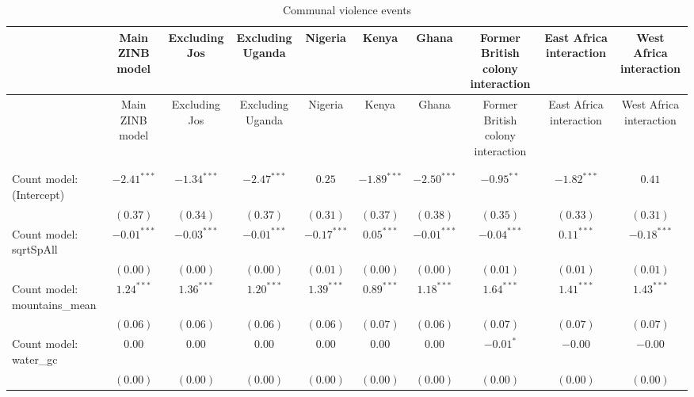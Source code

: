 
\begin{center}
\begin{longtable}{l c c c c c c c c c}
\toprule
 & Main ZINB model & Excluding Jos & Excluding Uganda & Nigeria & Kenya & Ghana & Former British colony interaction & East Africa
	    interaction & West Africa interaction \\
\midrule
\endfirsthead
\toprule
 & Main ZINB model & Excluding Jos & Excluding Uganda & Nigeria & Kenya & Ghana & Former British colony interaction & East Africa
	    interaction & West Africa interaction \\
\midrule
\endhead
\bottomrule
\endfoot
\bottomrule
\multicolumn{10}{l}{\scriptsize{$^{***}p<0.001$; $^{**}p<0.01$; $^{*}p<0.05$; $^{\cdot}p<0.1$}}\\
\caption{Communal violence events}
\label{zorg3}
\endlastfoot \\
Count model: (Intercept)       & $-2.41^{***}$ & $-1.34^{***}$ & $-2.47^{***}$ & $0.25$        & $-1.89^{***}$   & $-2.50^{***}$   & $-0.95^{**}$  & $-1.82^{***}$  & $0.41$        \\
                               & $(0.37)$      & $(0.34)$      & $(0.37)$      & $(0.31)$      & $(0.37)$        & $(0.38)$        & $(0.35)$      & $(0.33)$       & $(0.31)$      \\
Count model: sqrtSpAll         & $-0.01^{***}$ & $-0.03^{***}$ & $-0.01^{***}$ & $-0.17^{***}$ & $0.05^{***}$    & $-0.01^{***}$   & $-0.04^{***}$ & $0.11^{***}$   & $-0.18^{***}$ \\
                               & $(0.00)$      & $(0.00)$      & $(0.00)$      & $(0.01)$      & $(0.00)$        & $(0.00)$        & $(0.01)$      & $(0.01)$       & $(0.01)$      \\
Count model: mountains\_mean   & $1.24^{***}$  & $1.36^{***}$  & $1.20^{***}$  & $1.39^{***}$  & $0.89^{***}$    & $1.18^{***}$    & $1.64^{***}$  & $1.41^{***}$   & $1.43^{***}$  \\
                               & $(0.06)$      & $(0.06)$      & $(0.06)$      & $(0.06)$      & $(0.07)$        & $(0.06)$        & $(0.07)$      & $(0.07)$       & $(0.07)$      \\
Count model: water\_gc         & $0.00$        & $0.00$        & $0.00$        & $0.00$        & $0.00$          & $0.00$          & $-0.01^{*}$   & $-0.00$        & $-0.00$       \\
                               & $(0.00)$      & $(0.00)$      & $(0.00)$      & $(0.00)$      & $(0.00)$        & $(0.00)$        & $(0.00)$      & $(0.00)$       & $(0.00)$      \\

\end{longtable}
\end{center}
